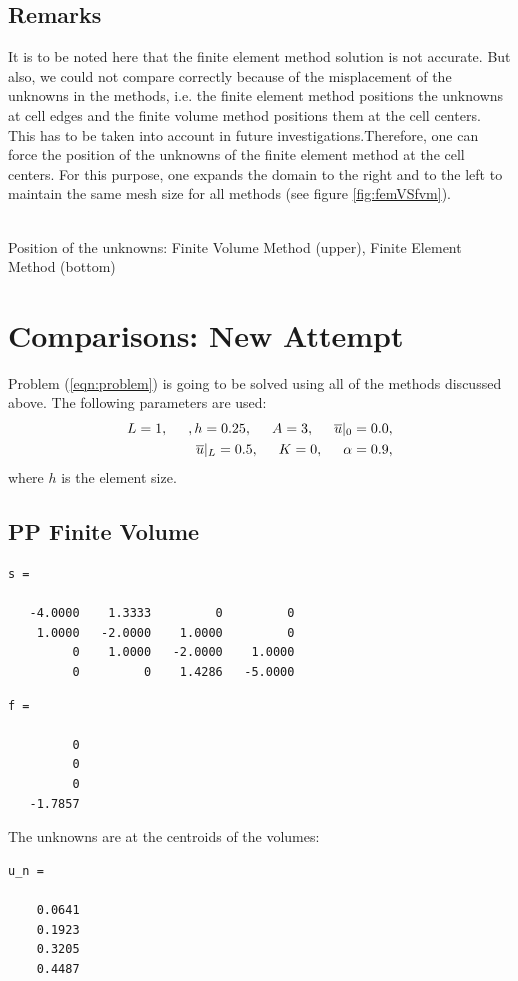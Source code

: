 \documentclass[a4paper,12pt]{article}
\makeatletter
\newenvironment{figurehere}
  {\def\@captype{figure}}
  {}
\makeatother
\begin{document}
\subsection{Remarks}
It is to be noted here that the finite element method solution is not accurate. But also, we could not compare correctly because of the misplacement of the unknowns in the methods, i.e. the finite element method positions the unknowns at cell edges and the finite volume method positions them at the cell centers. This has to be taken into account in future investigations.Therefore, one can force the position of the unknowns of the finite element method at the cell centers. For this purpose, one expands the domain to the right and to the left to maintain the same mesh size for all methods (see figure \ref{fig:femVSfvm}).
\begin{center}
\begin{figurehere} 
{}\\
\caption{Position of the unknowns: Finite Volume Method (upper), Finite Element Method (bottom)}\label{fig:femVSfvm}
\end{figurehere}
\end{center}
\section{Comparisons: New Attempt}\label{sec:comparisonNewAttempt}
Problem (\ref{eqn:problem}) is going to be solved using all of the methods discussed above. The following parameters are used:
\begin{eqnarray}
L = 1, \hspace{0.5cm}, h = 0.25, \hspace{0.5cm}A= 3, \hspace{0.5cm}\overline{u}\vert_0 = 0.0,\\ 
\overline{u}\vert_L=0.5, \hspace{0.5cm}K = 0,\hspace{0.5cm}\alpha = 0.9,
\end{eqnarray}
where $h$ is the element size.
\subsection{PP Finite Volume}
\begin{verbatim}
s =

   -4.0000    1.3333         0         0
    1.0000   -2.0000    1.0000         0
         0    1.0000   -2.0000    1.0000
         0         0    1.4286   -5.0000
\end{verbatim}
\begin{verbatim}
f =

         0
         0
         0
   -1.7857
\end{verbatim}
The unknowns are at the centroids of the volumes:
\begin{verbatim}
u_n =

    0.0641
    0.1923
    0.3205
    0.4487
\end{verbatim}
\end{document}
